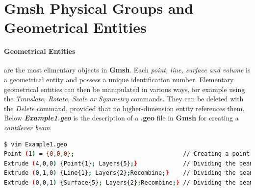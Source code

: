 \documentclass[11pt]{article}
\begin{document}
\section{Gmsh Physical Groups and Geometrical Entities}

\paragraph{Geometrical Entities} are the most elimentary objects in \textbf{Gmsh}. 
Each \textit{point, line, surface and volume} is a geometrical entity and possess 
a unique identification number. Elementary geometrical entities can then be 
manipulated in various ways, for example using the 
\textit{Translate, Rotate, Scale or Symmetry} commands. 
They can be deleted with the \textit{Delete} command, provided that no 
higher-dimension entity references them. 
Below \textbf{\textit{Example1.geo}} is the description of a \textbf{.geo} 
file in \textbf{Gmsh} for creating a \textit{cantilever beam}.

\begin{lstlisting}[language=bash,backgroundcolor=\color{grayish}]
$ vim Example1.geo 
Point (1) = {0,0,0};                               // Creating a point
Extrude (4,0,0) {Point{1}; Layers{5};}             // Dividing the beam length in 5 parts 
Extrude (0,1,0) {Line{1}; Layers{2};Recombine;}    // Dividing the beam width in 2 parts
Extrude (0,0,1) {Surface{5}; Layers{2};Recombine;} // Dividing the beam depth in 2 parts
\end{lstlisting}
\end{document}
